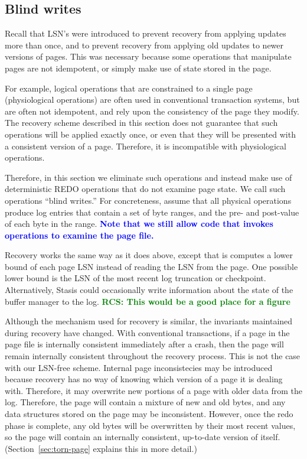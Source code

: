 \documentclass[letterpaper,twocolumn,10pt]{article}
\newcommand{\yad}{Stasis\xspace}
\newcommand{\diff}[1]{\textcolor{blue}{\bf #1}}
\newcommand{\rcs}[1]{\textcolor{green}{\bf RCS: #1}}
\begin{document}
\subsection{Blind writes}
Recall that LSN's were introduced to prevent recovery from applying
updates more than once, and to prevent recovery from applying old
updates to newer versions of pages.  This was necessary because some
operations that manipulate pages are not idempotent, or simply make
use of state stored in the page.  

For example, logical operations that are constrained to a single page
(physiological operations) are often used in conventional transaction
systems, but are often not idempotent, and rely upon the consistency
of the page they modify.  The recovery scheme described in this
section does not guarantee that such operations will be applied
exactly once, or even that they will be presented with a consistent
version of a page.  Therefore, it is incompatible with physiological
operations.

Therefore, in this section we eliminate such operations and instead
make use of deterministic REDO operations that do not examine page
state.  We call such operations ``blind writes.''  For concreteness,
assume that all physical operations produce log entries that contain a
set of byte ranges, and the pre- and post-value of each byte in the
range.  \diff{Note that we still allow code that invokes operations to
examine the page file.}

Recovery works the same way as it does above, except that is computes
a lower bound of each page LSN instead of reading the LSN from the
page.  One possible lower bound is the LSN of the most recent log
truncation or checkpoint.  Alternatively, \yad could occasionally
write information about the state of the buffer manager to the log. \rcs{This would be a good place for a figure}

Although the mechanism used for recovery is similar, the invariants
maintained during recovery have changed.  With conventional
transactions, if a page in the page file is internally consistent
immediately after a crash, then the page will remain internally
consistent throughout the recovery process.  This is not the case with
our LSN-free scheme.  Internal page inconsistecies may be introduced
because recovery has no way of knowing which version of a page it is
dealing with.  Therefore, it may overwrite new portions of a page with
older data from the log.
Therefore, the page will contain a mixture of new and old bytes, and
any data structures stored on the page may be inconsistent.  However,
once the redo phase is complete, any old bytes will be overwritten by
their most recent values, so the page will contain an internally
consistent, up-to-date version of itself.
(Section~\ref{sec:torn-page} explains this in more detail.)
\end{document}
